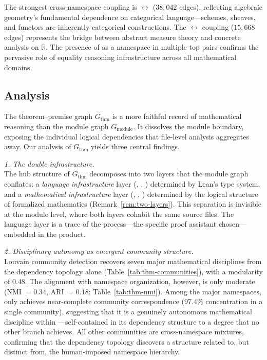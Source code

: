 The strongest cross-namespace coupling is  $\leftrightarrow$  ($38{,}042$ edges), reflecting algebraic geometry's fundamental dependence on categorical language---schemes, sheaves, and functors are inherently categorical constructions. The  $\leftrightarrow$  coupling ($15{,}668$ edges) represents the bridge between abstract measure theory and concrete analysis on $\mathbb{R}$. The presence of  as a namespace in multiple top pairs confirms the pervasive role of equality reasoning infrastructure across all mathematical domains.

\subsection{Analysis}
\label{sec:thm-conclusion}

The theorem--premise graph $G_{\mathrm{thm}}$ is a more faithful record of mathematical reasoning than the module graph $G_{\mathrm{module}}$. It dissolves the module boundary, exposing the individual logical dependencies that file-level analysis aggregates away. Our analysis of $G_{\mathrm{thm}}$ yields three central findings.

\medskip
\noindent\textit{1. The double infrastructure.}\\
The hub structure of $G_{\mathrm{thm}}$ decomposes into two layers that the module graph conflates: a \emph{language infrastructure} layer (, , ) determined by Lean's type system, and a \emph{mathematical infrastructure} layer (, , ) determined by the logical structure of formalized mathematics (Remark~\ref{rem:two-layers}). This separation is invisible at the module level, where both layers cohabit the same source files. The language layer is a trace of the process---the specific proof assistant chosen---embedded in the product.

\medskip
\noindent\textit{2. Disciplinary autonomy as emergent community structure.}\\
Louvain community detection recovers seven major mathematical disciplines from the dependency topology alone (Table~\ref{tab:thm-communities}), with a modularity of $0.48$. The alignment with namespace organization, however, is only moderate (NMI $= 0.34$, ARI $= 0.18$; Table~\ref{tab:thm-nmi}). Among the major namespaces, only  achieves near-complete community correspondence ($97.4\%$ concentration in a single community), suggesting that it is a genuinely autonomous mathematical discipline within ---self-contained in its dependency structure to a degree that no other branch achieves. All other communities are cross-namespace mixtures, confirming that the dependency topology discovers a structure related to, but distinct from, the human-imposed namespace hierarchy.

